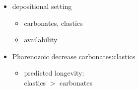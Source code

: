 \documentclass{beamer}
\begin{document}
\begin{frame}
\begin{columns}
\begin{column}{0.5\textwidth}
\begin{center}
        \tiny{}
      \end{center}
    \end{column}
    \begin{column}{0.5\textwidth}
      \begin{itemize}
        \item depositional setting
          \begin{itemize}
            \item carbonates, clastics
            \item availability
          \end{itemize}
        \item Pharenozoic decrease carbonates:clastics
          \begin{itemize}
            \item predicted longevity: \\clastics \(>\) carbonates
          \end{itemize}
      \end{itemize}
    \end{column}
  \end{columns}
\end{frame}
\end{document}
